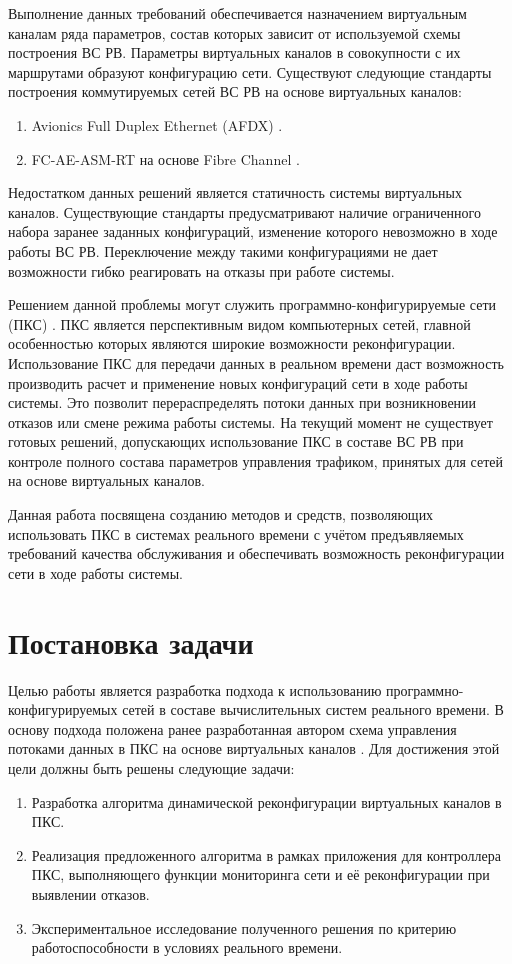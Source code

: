 \documentclass[12pt, a4paper]{article}
\begin{document}
Выполнение данных требований обеспечивается назначением виртуальным каналам ряда параметров, состав которых зависит от используемой схемы построения ВС РВ. Параметры виртуальных каналов в совокупности с их маршрутами образуют конфигурацию сети. Существуют следующие стандарты построения коммутируемых сетей ВС РВ на основе виртуальных каналов:
\begin{enumerate}
	\item Avionics Full Duplex Ethernet (AFDX) \cite{afdx}.
	\item FC-AE-ASM-RT на основе Fibre Channel \cite{fcaert}.
\end{enumerate}

Недостатком данных решений является статичность системы виртуальных каналов. Существующие стандарты предусматривают наличие ограниченного набора заранее заданных конфигураций, изменение которого невозможно в ходе работы ВС РВ. Переключение между такими конфигурациями не дает возможности гибко реагировать на отказы при работе системы.

Решением данной проблемы могут служить программно-конфигурируемые сети (ПКС) \cite{sdn}. ПКС является перспективным видом компьютерных сетей, главной особенностью которых являются широкие возможности реконфигурации. Использование ПКС для передачи данных в реальном времени даст возможность производить расчет и применение новых конфигураций сети в ходе работы системы. Это позволит перераспределять потоки данных при возникновении отказов или смене режима работы системы. На текущий момент не существует готовых решений, допускающих использование ПКС в составе ВС РВ при контроле полного состава параметров управления трафиком, принятых для сетей на основе виртуальных каналов.

Данная работа посвящена созданию методов и средств, позволяющих использовать ПКС в системах реального времени с учётом предъявляемых требований качества обслуживания и обеспечивать возможность реконфигурации сети в ходе работы системы.

\section{Постановка задачи}
Целью работы является разработка подхода к использованию программно-конфигурируемых сетей в составе вычислительных систем реального времени. В основу подхода положена ранее разработанная автором схема управления потоками данных в ПКС на основе виртуальных каналов \cite{vlsdn}. Для достижения этой цели должны быть решены следующие задачи:
\begin{enumerate}
	\item Разработка алгоритма динамической реконфигурации виртуальных каналов в ПКС.
	\item Реализация предложенного алгоритма в рамках приложения для контроллера ПКС, выполняющего функции мониторинга сети и её реконфигурации при выявлении отказов.
	\item Экспериментальное исследование полученного решения по критерию работоспособности в условиях реального времени.
\end{enumerate}
\end{document}
